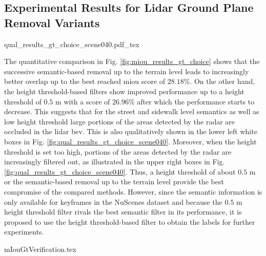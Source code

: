 \subsection{Experimental Results for Lidar Ground Plane Removal Variants}
\label{subsec:exp_results_gt}
\begin{center}
	{qual_results_gt_choice_scene040.pdf_tex}
\end{center}
The quantitative comparison in Fig. \ref{fig:miou_results_gt_choice} shows that the successive semantic-based removal up to the terrain level leads to increasingly better overlap up to the best reached m\gls{iou} score of $28.18\%$. On the other hand, the height threshold-based filters show improved performance up to a height threshold of $0.5$ m with a score of $26.96\%$ after which the performance starts to decrease. This suggests that for the street and sidewalk level semantics as well as low height threshold large portions of the areas detected by the radar are occluded in the lidar \gls{bev}. This is also qualitatively shown in the lower left white boxes in Fig. \ref{fig:qual_results_gt_choice_scene040}. Moreover, when the height threshold is set too high, portions of the areas detected by the radar are increasingly filtered out, as illustrated in the upper right boxes in Fig. \ref{fig:qual_results_gt_choice_scene040}. Thus, a height threshold of about $0.5$ m or the semantic-based removal up to the terrain level provide the best compromise of the compared methods. However, since the semantic information is only available for keyframes in the NuScenes dataset and because the $0.5$ m height threshold filter rivals the best semantic filter in its performance, it is proposed to use the height threshold-based filter to obtain the labels for further experiments.
\begin{center}
	{mIouGtVerification.tex}
\end{center}
%
